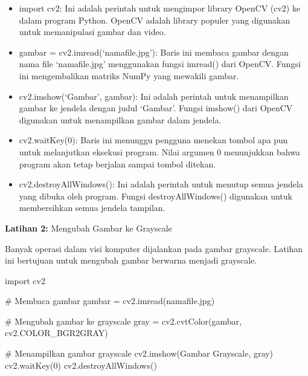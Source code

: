 \documentclass[
  letterpaper,
  DIV=11,
  numbers=noendperiod]{scrreprt}
\newenvironment{Shaded}{\begin{snugshade}}{\end{snugshade}}
\newcommand{\CommentTok}[1]{\textcolor[rgb]{0.37,0.37,0.37}{#1}}
\newcommand{\DecValTok}[1]{\textcolor[rgb]{0.68,0.00,0.00}{#1}}
\newcommand{\ImportTok}[1]{\textcolor[rgb]{0.00,0.46,0.62}{#1}}
\newcommand{\NormalTok}[1]{\textcolor[rgb]{0.00,0.23,0.31}{#1}}
\newcommand{\OperatorTok}[1]{\textcolor[rgb]{0.37,0.37,0.37}{#1}}
\newcommand{\StringTok}[1]{\textcolor[rgb]{0.13,0.47,0.30}{#1}}
\begin{document}
\begin{tcolorbox}[enhanced jigsaw, opacityback=0, colbacktitle=quarto-callout-tip-color!10!white, breakable, titlerule=0mm, left=2mm, toptitle=1mm, rightrule=.15mm, leftrule=.75mm, colback=white, opacitybacktitle=0.6, arc=.35mm, toprule=.15mm, coltitle=black, colframe=quarto-callout-tip-color-frame, bottomtitle=1mm, title=\textcolor{quarto-callout-tip-color}{\faLightbulb}\hspace{0.5em}{Penjelasan Kode}, bottomrule=.15mm]

\begin{itemize}
\item
  import cv2: Ini adalah perintah untuk mengimpor library OpenCV (cv2)
  ke dalam program Python. OpenCV adalah library populer yang digunakan
  untuk memanipulasi gambar dan video.
\item
  gambar = cv2.imread(`namafile.jpg'): Baris ini membaca gambar dengan
  nama file `namafile.jpg' menggunakan fungsi imread() dari OpenCV.
  Fungsi ini mengembalikan matriks NumPy yang mewakili gambar.
\item
  cv2.imshow(`Gambar', gambar): Ini adalah perintah untuk menampilkan
  gambar ke jendela dengan judul `Gambar'. Fungsi imshow() dari OpenCV
  digunakan untuk menampilkan gambar dalam jendela.
\item
  cv2.waitKey(0): Baris ini menunggu pengguna menekan tombol apa pun
  untuk melanjutkan eksekusi program. Nilai argumen 0 menunjukkan bahwa
  program akan tetap berjalan sampai tombol ditekan.
\item
  cv2.destroyAllWindows(): Ini adalah perintah untuk menutup semua
  jendela yang dibuka oleh program. Fungsi destroyAllWindows() digunakan
  untuk membersihkan semua jendela tampilan.\\
\end{itemize}

\end{tcolorbox}

\textbf{Latihan 2:} Mengubah Gambar ke Grayscale

Banyak operasi dalam visi komputer dijalankan pada gambar grayscale.
Latihan ini bertujuan untuk mengubah gambar berwarna menjadi grayscale.

\begin{Shaded}
\begin{Highlighting}[]
\ImportTok{import}\NormalTok{ cv2}

\CommentTok{\# Membaca gambar}
\NormalTok{gambar }\OperatorTok{=}\NormalTok{ cv2.imread(}\StringTok{\textquotesingle{}namafile.jpg\textquotesingle{}}\NormalTok{)}

\CommentTok{\# Mengubah gambar ke grayscale}
\NormalTok{gray }\OperatorTok{=}\NormalTok{ cv2.cvtColor(gambar, cv2.COLOR\_BGR2GRAY)}

\CommentTok{\# Menampilkan gambar grayscale}
\NormalTok{cv2.imshow(}\StringTok{\textquotesingle{}Gambar Grayscale\textquotesingle{}}\NormalTok{, gray)}
\NormalTok{cv2.waitKey(}\DecValTok{0}\NormalTok{)}
\NormalTok{cv2.destroyAllWindows()}
\end{Highlighting}
\end{Shaded}
\end{document}

